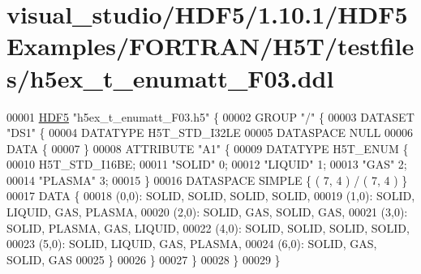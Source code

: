 \hypertarget{visual__studio_2_h_d_f5_21_810_81_2_h_d_f5_examples_2_f_o_r_t_r_a_n_2_h5_t_2testfiles_2h5ex__t__enumatt___f03_8ddl_source}{}\section{visual\+\_\+studio/\+H\+D\+F5/1.10.1/\+H\+D\+F5\+Examples/\+F\+O\+R\+T\+R\+A\+N/\+H5\+T/testfiles/h5ex\+\_\+t\+\_\+enumatt\+\_\+\+F03.ddl}
\label{visual__studio_2_h_d_f5_21_810_81_2_h_d_f5_examples_2_f_o_r_t_r_a_n_2_h5_t_2testfiles_2h5ex__t__enumatt___f03_8ddl_source}

\begin{DoxyCode}
00001 \hyperlink{namespace_h_d_f5}{HDF5} \textcolor{stringliteral}{"h5ex\_t\_enumatt\_F03.h5"} \{
00002 GROUP \textcolor{stringliteral}{"/"} \{
00003    DATASET \textcolor{stringliteral}{"DS1"} \{
00004       DATATYPE  H5T\_STD\_I32LE
00005       DATASPACE  NULL
00006       DATA \{
00007       \}
00008       ATTRIBUTE \textcolor{stringliteral}{"A1"} \{
00009          DATATYPE  H5T\_ENUM \{
00010             H5T\_STD\_I16BE;
00011             \textcolor{stringliteral}{"SOLID"}            0;
00012             \textcolor{stringliteral}{"LIQUID"}           1;
00013             \textcolor{stringliteral}{"GAS"}              2;
00014             \textcolor{stringliteral}{"PLASMA"}           3;
00015          \}
00016          DATASPACE  SIMPLE \{ ( 7, 4 ) / ( 7, 4 ) \}
00017          DATA \{
00018          (0,0): SOLID, SOLID, SOLID, SOLID,
00019          (1,0): SOLID, LIQUID, GAS, PLASMA,
00020          (2,0): SOLID, GAS, SOLID, GAS,
00021          (3,0): SOLID, PLASMA, GAS, LIQUID,
00022          (4,0): SOLID, SOLID, SOLID, SOLID,
00023          (5,0): SOLID, LIQUID, GAS, PLASMA,
00024          (6,0): SOLID, GAS, SOLID, GAS
00025          \}
00026       \}
00027    \}
00028 \}
00029 \}
\end{DoxyCode}
